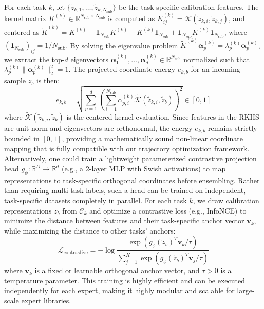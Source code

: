 For each task $k$, let $\{\tilde{z}_{k, 1}, \dots, \tilde{z}_{k, N_{\text{sub}}}\}$ be the task-specific calibration features. The kernel matrix $K^{(k)} \in \mathbb{R}^{N_{\text{sub}} \times N_{\text{sub}}}$ is computed as $K^{(k)}_{ij} = \mathcal{K}(\tilde{z}_{k, i}, \tilde{z}_{k, j})$, and centered as $\tilde{K}^{(k)} = K^{(k)} - \mathbf{1}_{N_{\text{sub}}} K^{(k)} - K^{(k)} \mathbf{1}_{N_{\text{sub}}} + \mathbf{1}_{N_{\text{sub}}} K^{(k)} \mathbf{1}_{N_{\text{sub}}}$, where $(\mathbf{1}_{N_{\text{sub}}})_{ij} = 1/N_{\text{sub}}$. By solving the eigenvalue problem $\tilde{K}^{(k)} \boldsymbol{\alpha}^{(k)}_p = \lambda^{(k)}_p \boldsymbol{\alpha}^{(k)}_p$, we extract the top-$d$ eigenvectors $\boldsymbol{\alpha}^{(k)}_1, \dots, \boldsymbol{\alpha}^{(k)}_d \in \mathbb{R}^{N_{\text{sub}}}$ normalized such that $\lambda^{(k)}_p \|\boldsymbol{\alpha}^{(k)}_p\|_2^2 = 1$. The projected coordinate energy $e_{k, b}$ for an incoming sample $z_b$ is then:
\begin{equation}
e_{k, b} = \sqrt{\sum_{p=1}^d \left( \sum_{i=1}^{N_{\text{sub}}} \alpha^{(k)}_{p, i} \tilde{\mathcal{K}}(\tilde{z}_{k, i}, \tilde{z}_b) \right)^2} \in [0, 1]
\end{equation}
where $\tilde{\mathcal{K}}(\tilde{z}_{k, i}, \tilde{z}_b)$ is the centered kernel evaluation. Since features in the RKHS are unit-norm and eigenvectors are orthonormal, the energy $e_{k, b}$ remains strictly bounded in $[0, 1]$, providing a mathematically sound non-linear coordinate mapping that is fully compatible with our trajectory optimization framework. Alternatively, one could train a lightweight parameterized contrastive projection head $g_\phi: \mathbb{R}^D \to \mathbb{R}^d$ (e.g., a 2-layer MLP with Swish activations) to map representations to task-specific orthogonal coordinates before ensembling. Rather than requiring multi-task labels, such a head can be trained on independent, task-specific datasets completely in parallel. For each task $k$, we draw calibration representations $z_b$ from $\mathcal{C}_k$ and optimize a contrastive loss (e.g., InfoNCE) to minimize the distance between features and their task-specific anchor vector $\mathbf{v}_k$, while maximizing the distance to other tasks' anchors:
\begin{equation}
\mathcal{L}_{\text{contrastive}} = -\log \frac{\exp(g_\phi(\tilde{z}_b)^T \mathbf{v}_k / \tau)}{\sum_{j=1}^K \exp(g_\phi(\tilde{z}_b)^T \mathbf{v}_j / \tau)}
\end{equation}
where $\mathbf{v}_k$ is a fixed or learnable orthogonal anchor vector, and $\tau > 0$ is a temperature parameter. This training is highly efficient and can be executed independently for each expert, making it highly modular and scalable for large-scale expert libraries.

